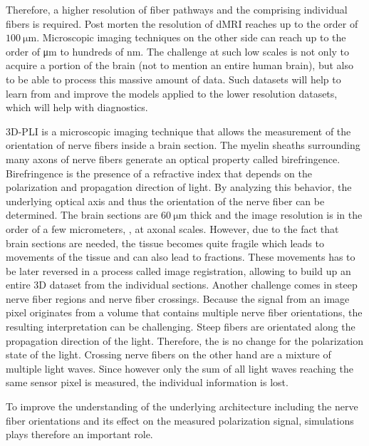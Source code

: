 Therefore, a higher resolution of fiber pathways and the comprising individual fibers is required.
Post morten the resolution of \ac{dMRI} reaches up to the order of $\SI{100}{\micro\meter}$.
Microscopic imaging techniques on the other side can reach up to the order of \si{\micro\meter} to hundreds of \si{\nano\meter}.
The challenge at such low scales is not only to acquire a portion of the brain (not to mention an entire human brain), but also to be able to process this massive amount of data.
Such datasets will help to learn from and improve the models applied to the lower resolution datasets, which will help with \eg{} diagnostics. \\
\cite{MaierHein2017, Schilling2021, Yendiki2021, Costantini2021}
\par
% 
\ac{3D-PLI} is a microscopic imaging technique that allows the measurement of the orientation of nerve fibers inside a brain section.
The myelin sheaths surrounding many axons of nerve fibers generate an optical property called birefringence.
Birefringence is the presence of a refractive index that depends on the polarization and propagation direction of light.
By analyzing this behavior, the underlying optical axis and thus the orientation of the nerve fiber can be determined.
The brain sections are $\SI{60}{\micro\meter}$ thick and the image resolution is in the order of a few micrometers, \ie{}, at axonal scales.
However, due to the fact that brain sections are needed, the tissue becomes quite fragile which leads to movements of the tissue and can also lead to fractions.
These movements has to be later reversed in a process called image registration, allowing to build up an entire 3D dataset from the individual sections.
Another challenge comes in steep nerve fiber regions and nerve fiber crossings.
Because the signal from an image pixel originates from a volume that contains multiple nerve fiber orientations, the resulting interpretation can be challenging.
Steep fibers are \eg{} orientated along the propagation direction of the light.
Therefore, the is no change for the polarization state of the light.
Crossing nerve fibers on the other hand are a mixture of multiple light waves.
Since however only the sum of all light waves reaching the same sensor pixel is measured, the individual information is lost. \\ 
\cite{Axer2011a, Axer2011, Axer2016}
\par
% 
To improve the understanding of the underlying architecture including the nerve fiber orientations and its effect on the measured polarization signal, simulations plays therefore an important role.
